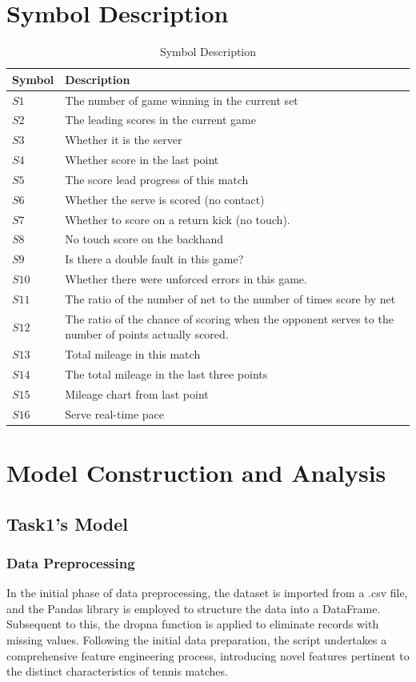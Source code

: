 \documentclass{article}
\begin{document}
\section{Symbol Description}
\begin{table}[H]
\centering
\begin{tabular}{|>{\centering\arraybackslash}m{2.5cm}|p{}|}
\hline
\textbf{Symbol} & \textbf{Description} \\ \hline
$S1$ & The number of game winning in the current set \\ \hline
$S2$ & The leading scores in the current game \\ \hline
$S3$ & Whether it is the server \\ \hline
$S4$ & Whether score in the last point \\ \hline
$S5$ & The score lead progress of this match\\ \hline
$S6$ & Whether the serve is scored (no contact) \\ \hline
$S7$ & Whether to score on a return kick (no touch). \\ \hline
$S8$ & No touch score on the backhand \\ \hline
$S9$ & Is there a double fault in this game? \\ \hline
$S10$ & Whether there were unforced errors in this game. \\ \hline
$S11$ & The ratio of the number of net to the number of times score by net \\ \hline
$S12$ & The ratio of the chance of scoring when the opponent serves to the number of points actually scored. \\ \hline
$S13$ & Total mileage in this match \\ \hline
$S14$ & The total mileage in the last three points \\ \hline
$S15$ & Mileage chart from last point \\ \hline
$S16$ & Serve real-time pace \\ \hline
\end{tabular}
\caption{Symbol Description}
\end{table}
\section{Model Construction and Analysis}
\subsection{Task1's Model}
\subsubsection{Data Preprocessing}
In the initial phase of data preprocessing, the dataset is imported from a .csv file, and the Pandas library is employed to structure the data into a DataFrame. Subsequent to this, the dropna function is applied to eliminate records with missing values. Following the initial data preparation, the script undertakes a comprehensive feature engineering process, introducing novel features pertinent to the distinct characteristics of tennis matches.
\end{document}
